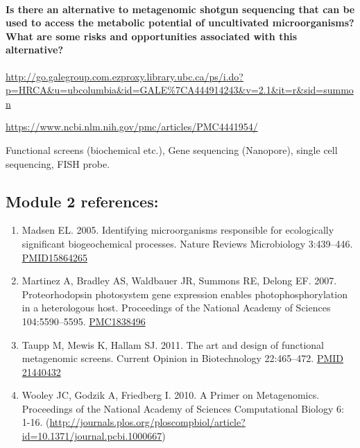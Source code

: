 \documentclass[]{article}
\let\oldparagraph\paragraph
\renewcommand{\paragraph}[1]{\oldparagraph{#1}\mbox{}}
\begin{document}
\paragraph{Is there an alternative to metagenomic shotgun sequencing
that can be used to access the metabolic potential of uncultivated
microorganisms? What are some risks and opportunities associated with
this
alternative?}\label{is-there-an-alternative-to-metagenomic-shotgun-sequencing-that-can-be-used-to-access-the-metabolic-potential-of-uncultivated-microorganisms-what-are-some-risks-and-opportunities-associated-with-this-alternative}

\url{http://go.galegroup.com.ezproxy.library.ubc.ca/ps/i.do?p=HRCA\&u=ubcolumbia\&id=GALE\%7CA444914243\&v=2.1\&it=r\&sid=summon}

\url{https://www.ncbi.nlm.nih.gov/pmc/articles/PMC4441954/}

Functional screens (biochemical etc.), Gene sequencing (Nanopore),
single cell sequencing, FISH probe.

\subsection{Module 2 references:}\label{module-2-references}

\begin{enumerate}
\def\labelenumi{\arabic{enumi}.}
\item
  Madsen EL. 2005. Identifying microorganisms responsible for
  ecologically significant biogeochemical processes. Nature Reviews
  Microbiology 3:439--446.
  \href{https://www.ncbi.nlm.nih.gov/pubmed/15864265}{PMID15864265}
\item
  Martinez A, Bradley AS, Waldbauer JR, Summons RE, Delong EF. 2007.
  Proteorhodopsin photosystem gene expression enables
  photophosphorylation in a heterologous host. Proceedings of the
  National Academy of Sciences 104:5590--5595.
  \href{https://www.ncbi.nlm.nih.gov/pmc/articles/PMC1838496/}{PMC1838496}
\item
  Taupp M, Mewis K, Hallam SJ. 2011. The art and design of functional
  metagenomic screens. Current Opinion in Biotechnology 22:465--472.
  \href{https://www.ncbi.nlm.nih.gov/pubmed/21440432}{PMID 21440432}
\item
  Wooley JC, Godzik A, Friedberg I. 2010. A Primer on Metagenomics.
  Proceedings of the National Academy of Sciences Computational Biology
  6: 1-16.
  (\url{http://journals.plos.org/ploscompbiol/article?id=10.1371/journal.pcbi.1000667})
\end{enumerate}
\end{document}
